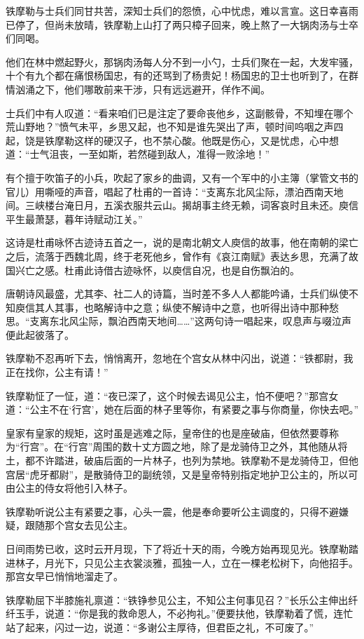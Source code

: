 \documentclass[12pt,oneside]{book}
\begin{document}
铁摩勒与士兵们同甘共苦，深知士兵们的怨愤，心中忧虑，难以言宣。这日幸喜雨已停了，但尚未放晴，铁摩勒上山打了两只樟子回来，晚上熬了一大锅肉汤与士卒们同喝。

他们在林中燃起野火，那锅肉汤每人分不到一小勺，士兵们聚在一起，大发牢骚，十个有九个都在痛恨杨国忠，有的还骂到了杨贵妃！杨国忠的卫士也听到了，在群情汹涌之下，他们哪敢前来干涉，只有远远避开，佯作不闻。

士兵们中有人叹道：``看来咱们已是注定了要命丧他乡，这副骸骨，不知埋在哪个荒山野地？''愤气未平，乡思又起，也不知是谁先哭出了声，顿时间呜咽之声四起，饶是铁摩勒这样的硬汉子，也不禁心酸。他既是伤心，又是忧虑，心中想道：``士气沮丧，一至如斯，若然碰到敌人，准得一败涂地！''

有个擅于吹笛子的小兵，吹起了家乡的曲调，又有一个军中的小主簿（掌管文书的官儿）用嘶哑的声音，唱起了杜甫的一首诗：``支离东北风尘际，漂泊西南天地间。三峡楼台淹日月，五溪衣服共云山。揭胡事主终无赖，词客哀时且未还。庾信平生最萧瑟，暮年诗赋动江关。''

这诗是杜甫咏怀古迹诗五首之一，说的是南北朝文人庾信的故事，他在南朝的梁亡之后，流落于西魏北周，终于老死他乡，曾作有《哀江南赋》表达乡思，充满了故国兴亡之感。杜甫此诗借古迹咏怀，以庾信自况，也是自伤飘泊的。

唐朝诗风最盛，尤其李、社二人的诗篇，当时差不多人人都能吟诵，士兵们纵使不知庾信其人其事，也略解诗中之意；纵使不解诗中之意，也听得出诗中那种愁思。``支离东北风尘际，飘泊西南天地间\ldots\ldots{}''这两句诗一唱起来，叹息声与啜泣声便此起彼落了。

铁摩勒不忍再听下去，悄悄离开，忽地在个宫女从林中闪出，说道：``铁都尉，我正在找你，公主有请！''

铁摩勒怔了一怔，道：``夜已深了，这个时候去谒见公主，怕不便吧？''那宫女道：``公主不在`行宫'，她在后面的林子里等你，有紧要之事与你商量，你快去吧。''

皇家有皇家的规矩，这时虽是逃难之际，皇帝住的也是座破庙，但依然要尊称为``行宫''。在``行宫''周围的数十丈方圆之地，除了是龙骑侍卫之外，其他随从将土，都不许踏进，破庙后面的一片林子，也列为禁地。铁摩勒不是龙骑侍卫，但他宫居``虎牙都尉''，是散骑侍卫的副统领，又是皇帝特别指定地护卫公主的，所以可由公主的侍女将他引入林子。

铁摩勒听说公主有紧要之事，心头一震，他是奉命要听公主调度的，只得不避嫌疑，跟随那个宫女去见公主。

日间雨势已收，这时云开月现，下了将近十天的雨，今晚方始再现见光。铁摩勒踏进林子，月光下，只见公主衣裳淡雅，孤独一人，立在一棵老松树下，向他招手。那宫女早已悄悄地溜走了。

铁摩勒屈下半膝施礼禀道：``铁铮参见公主，不知公主何事见召？''长乐公主伸出纤纤玉手，说道：``你是我的救命恩人，不必拘礼。''便要扶他，铁摩勒着了慌，连忙站了起来，闪过一边，说道：``多谢公主厚待，但君臣之礼，不可废了。''
\end{document}
